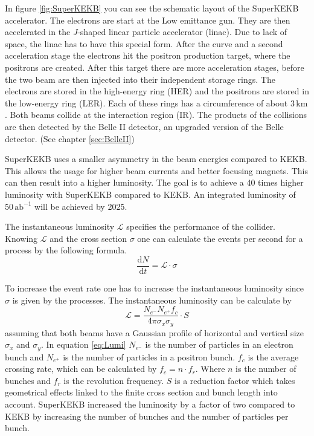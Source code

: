\documentclass[a4paper,11pt,twosided,final,german,openbib,pdftex,listof=totoc,bibliography=totoc]{scrbook}
\begin{document}
In figure \ref{fig:SuperKEKB} you can see the schematic layout of the SuperKEKB accelerator. The electrons are start at the Low emittance gun. They are then accelerated in the \textit{J}-shaped linear particle accelerator (linac). Due to lack of space, the linac has to have this special form.\cite{KEKBJArc} After the curve and a second acceleration stage the electrons hit the positron production target, where the positrons are created. After this target there are more acceleration stages, before the two beam are then injected into their independent storage rings. The electrons are stored in the high-energy ring (HER) and the positrons are stored in the low-energy ring (LER). Each of these rings has a circumference of about $3\,\textrm{km}$. Both beams collide at the interaction region (IR). The products of the collisions are then detected by the Belle II detector, an upgraded version of the Belle detector.\cite{B2B} (See chapter \ref{sec:BelleII})

SuperKEKB uses a smaller asymmetry in the beam energies compared to KEKB. This allows the usage for higher beam currents and better focusing magnets. This can then result into a higher luminosity. The goal is to achieve a 40 times higher luminosity with SuperKEKB compared to KEKB.
An integrated luminosity of $50\,\textrm{ab}^{-1}$ will be achieved by 2025.\cite{B2B}

The instantaneous luminosity $\mathcal{L}$ specifies the performance of the collider. Knowing $\mathcal{L} $ and the cross section $\sigma$ one can calculate the events per second for a process by the following formula.
\begin{equation}
\frac{\textrm{d}N}{\textrm{d}t} = \mathcal{L} \cdot \sigma
\end{equation} 

To increase the event rate one has to increase the instantaneous luminosity since $\sigma$ is given by the processes. The instantaneous luminosity can be calculate by
\begin{equation}
	\mathcal{L} = \frac{N_{e^-}N_{e^+}f_c}{4\pi \sigma_x \sigma_y} \cdot S
	\label{eq:Lumi}
\end{equation}
 assuming that both beams have a Gaussian profile of horizontal and vertical size $\sigma_x$ and $\sigma_y$. In equation \ref{eq:Lumi} $N_{e^-}$ is the number of particles in an electron bunch and $N_{e^+}$ is the number of particles in a positron bunch. $f_c$ is the average crossing rate, which can be calculated by $f_c = n \cdot f_r$. Where $n$ is the number of bunches and $f_r$ is the revolution frequency. $S$ is a reduction factor which takes geometrical effects linked to the finite cross section and bunch length into account.\cite{herr2006concept} SuperKEKB increased the luminosity by a factor of two compared to KEKB by increasing the number of bunches and the number of particles per bunch.
 
\end{document}
